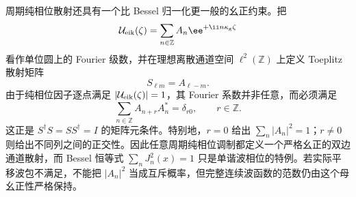 周期纯相位散射还具有一个比 Bessel 归一化更一般的幺正约束。把
\[
\mathcal U_{\rm eik}(\zeta)
=\sum_{n\in\mathbb Z}A_n\ee^{+\ii n\kappa_{\rm g}\zeta}
\]
看作单位圆上的 Fourier 级数，并在理想离散通道空间 $\ell^2(\mathbb Z)$ 上定义 Toeplitz 散射矩阵
\begin{equation}
\boxed{
S_{\ell m}=A_{\ell-m}.}
\label{eq:periodic_phase_toeplitz_matrix}
\end{equation}
由于纯相位因子逐点满足 $|\mathcal U_{\rm eik}(\zeta)|=1$，其 Fourier 系数并非任意，而必须满足
\begin{equation}
\boxed{
\sum_{n\in\mathbb Z}A_{n+r}A_n^*=\delta_{r0},
\qquad r\in\mathbb Z.}
\label{eq:periodic_phase_fourier_unitarity_identity}
\end{equation}
这正是 $S^\dagger S=SS^\dagger=I$ 的矩阵元条件。特别地，$r=0$ 给出
$\sum_n|A_n|^2=1$；$r\neq0$ 则给出不同列之间的正交性。因此任意周期纯相位调制都定义一个严格幺正的双边通道散射，而 Bessel 恒等式
$\sum_nJ_n^2(x)=1$ 只是单谐波相位的特例。若实际平移波包不满足，不能把 $|A_n|^2$ 当成互斥概率，但完整连续波函数的范数仍由这个母幺正性严格保持。

